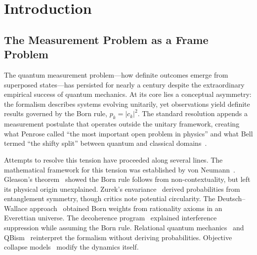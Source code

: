 \documentclass[aps,prd,twocolumn,superscriptaddress,nofootinbib,floatfix]{revtex4-2}
\begin{document}
\maketitle

\section{Introduction}\label{sec:intro}

\subsection{The Measurement Problem as a Frame Problem}

The quantum measurement problem---how definite outcomes emerge from superposed states---has persisted for nearly a century despite the extraordinary empirical success of quantum mechanics. At its core lies a conceptual asymmetry: the formalism describes systems evolving unitarily, yet observations yield definite results governed by the Born rule, $p_k = |c_k|^2$. The standard resolution appends a measurement postulate that operates outside the unitary framework, creating what Penrose called ``the most important open problem in physics'' and what Bell termed ``the shifty split'' between quantum and classical domains~\cite{bellAgainstMeasurement1990}.

Attempts to resolve this tension have proceeded along several lines. The mathematical framework for this tension was established by von Neumann~\cite{vonneumannMathematicalFoundationsQuantum1955}. Gleason's theorem~\cite{gleasonMeasuresClosedSubspaces1957} showed the Born rule follows from non-contextuality, but left its physical origin unexplained. Zurek's envariance~\cite{zurekDecoherenceEinselectionQuantum2003,zurekProbabilitiesEntanglementBorns2005} derived probabilities from entanglement symmetry, though critics note potential circularity. The Deutsch--Wallace approach~\cite{deutschQuantumTheoryProbability1999,wallaceEmergentMultiverseQuantum2012} obtained Born weights from rationality axioms in an Everettian universe. The decoherence program~\cite{zehInterpretationMeasurementQuantum1970,joosDecoherenceAppearanceClassical2003} explained interference suppression while assuming the Born rule. Relational quantum mechanics~\cite{rovelliRelationalQuantumMechanics1996} and QBism~\cite{fuchsIntroductionQBism2014} reinterpret the formalism without deriving probabilities. Objective collapse models~\cite{ghirardiUnifiedDynamicsMicroscopic1986,pearleCombiningStochasticDynamical1989,diosiUniversalMasterEquation1987,penroseGravitysRoleQuantum1996} modify the dynamics itself.
\end{document}
